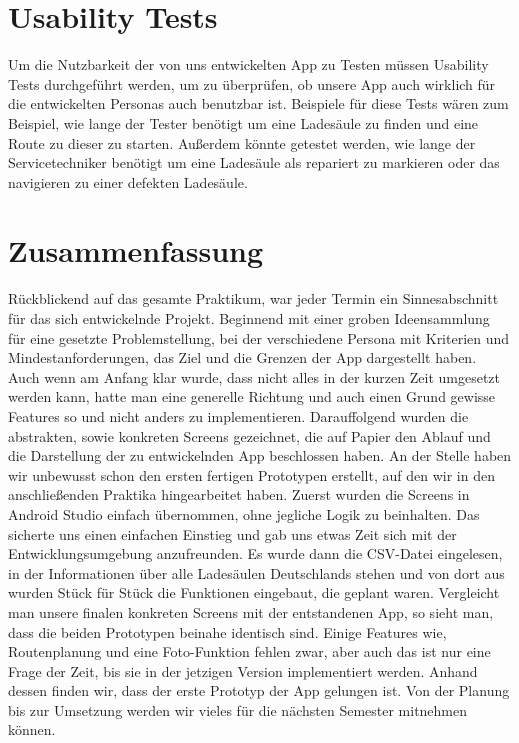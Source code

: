 \documentclass[utf8]{lni}
\begin{document}
\section{Usability Tests}
Um die Nutzbarkeit der von uns entwickelten App zu Testen müssen Usability Tests durchgeführt werden, um zu überprüfen, ob unsere App auch wirklich für die entwickelten Personas auch benutzbar ist. Beispiele für diese Tests wären zum Beispiel, wie lange der Tester benötigt um eine Ladesäule zu finden und eine Route zu dieser zu starten. Außerdem könnte getestet werden, wie lange der Servicetechniker benötigt um eine Ladesäule als repariert zu markieren oder das navigieren zu einer defekten Ladesäule.

\section{Zusammenfassung}
Rückblickend auf das gesamte Praktikum, war jeder Termin ein Sinnesabschnitt für das sich entwickelnde Projekt. Beginnend mit einer groben Ideensammlung für eine gesetzte Problemstellung, bei der verschiedene Persona mit Kriterien und Mindestanforderungen, das Ziel und die Grenzen der App dargestellt haben. Auch wenn am Anfang klar wurde, dass nicht alles in der kurzen Zeit umgesetzt werden kann, hatte man eine generelle Richtung und auch einen Grund gewisse Features so und nicht anders zu implementieren. Darauffolgend wurden die abstrakten, sowie konkreten Screens gezeichnet, die auf Papier den Ablauf und die Darstellung der zu entwickelnden App beschlossen haben. An der Stelle haben wir unbewusst schon den ersten fertigen Prototypen erstellt, auf den wir in den anschließenden Praktika hingearbeitet haben. Zuerst wurden die Screens in Android Studio einfach übernommen, ohne jegliche Logik zu beinhalten. Das sicherte uns einen einfachen Einstieg und gab uns etwas Zeit sich mit der Entwicklungsumgebung anzufreunden. Es wurde dann die CSV-Datei eingelesen, in der Informationen über alle Ladesäulen Deutschlands stehen und von dort aus wurden Stück für Stück die Funktionen eingebaut, die geplant waren.
Vergleicht man unsere finalen konkreten Screens mit der entstandenen App, so sieht man, dass die beiden Prototypen beinahe identisch sind. Einige Features wie, Routenplanung und eine Foto-Funktion fehlen zwar, aber auch das ist nur eine Frage der Zeit, bis sie in der jetzigen Version implementiert werden. Anhand dessen finden wir, dass der erste Prototyp der App gelungen ist. Von der Planung bis zur Umsetzung werden wir vieles für die nächsten Semester mitnehmen können.
\end{document}
